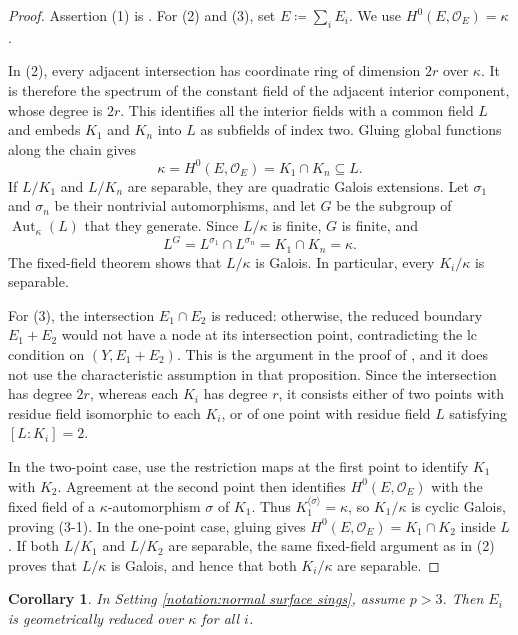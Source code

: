 \documentclass[12pt]{amsart}
\newcommand{\sO}{\mathcal{O}}
\theoremstyle{plain}
\newtheorem{cor}[thm]{Corollary}
\theoremstyle{definition}
\theoremstyle{remark}
\newtheorem{defn and notation}[thm]{Definition and Notation}
\theoremstyle{plain}
\numberwithin{equation}{thm}
\begin{document}
\begin{proof}
    Assertion (1) is \cite[Proposition 4.8]{Sato23}.
    For (2) and (3), set $E\coloneqq\sum_iE_i$.
    We use $H^0(E,\sO_E)=\kappa$ \cite[Corollary 10.10]{Kol13}.

    In (2), every adjacent intersection has coordinate ring of dimension $2r$ over $\kappa$.
    It is therefore the spectrum of the constant field of the adjacent interior component, whose degree is $2r$.
    This identifies all the interior fields with a common field $L$ and embeds $K_1$ and $K_n$ into $L$ as subfields of index two.
    Gluing global functions along the chain \cite[Lemma 4.7]{Sato23} gives
    \[
    \kappa=H^0(E,\sO_E)=K_1\cap K_n\subseteq L.
    \]
    If $L/K_1$ and $L/K_n$ are separable, they are quadratic Galois extensions.
    Let $\sigma_1$ and $\sigma_n$ be their nontrivial automorphisms, and let $G$ be the subgroup of $\operatorname{Aut}_{\kappa}(L)$ that they generate.
    Since $L/\kappa$ is finite, $G$ is finite, and
    \[
    L^G=L^{\sigma_1}\cap L^{\sigma_n}=K_1\cap K_n=\kappa.
    \]
    The fixed-field theorem shows that $L/\kappa$ is Galois. In particular, every $K_i/\kappa$ is separable.

    For (3), the intersection $E_1\cap E_2$ is reduced: otherwise, the reduced boundary $E_1+E_2$ would not have a node at its intersection point, contradicting the lc condition on $(Y,E_1+E_2)$.
    This is the argument in the proof of \cite[Proposition 4.11]{Sato23}, and it does not use the characteristic assumption in that proposition.
    Since the intersection has degree $2r$, whereas each $K_i$ has degree $r$, it consists either of two points with residue field isomorphic to each $K_i$, or of one point with residue field $L$ satisfying $[L:K_i]=2$.

    In the two-point case, use the restriction maps at the first point to identify $K_1$ with $K_2$.
    Agreement at the second point then identifies $H^0(E,\sO_E)$ with the fixed field of a $\kappa$-automorphism $\sigma$ of $K_1$.
    Thus $K_1^{\langle\sigma\rangle}=\kappa$, so $K_1/\kappa$ is cyclic Galois, proving (3-1).
    In the one-point case, gluing gives $H^0(E,\sO_E)=K_1\cap K_2$ inside $L$.
    If both $L/K_1$ and $L/K_2$ are separable, the same fixed-field argument as in (2) proves that $L/\kappa$ is Galois, and hence that both $K_i/\kappa$ are separable.
\end{proof}

\begin{cor}\label{cor:geom red,p>3}
    In Setting \ref{notation:normal surface sings}, assume $p>3$.
    Then $E_i$ is geometrically reduced over $\kappa$ for all $i$.
\end{cor}
\end{document}
